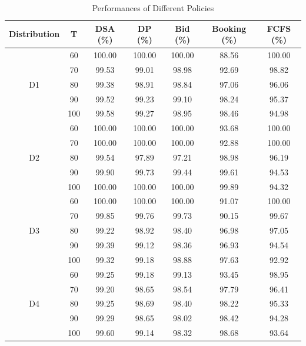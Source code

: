 \begin{table}[h]
  \centering
  \caption{Performances of Different Policies}
  \begin{tabular}{cc|ccccc}
  \hline
  Distribution & T & DSA (\%) & DP (\%) & Bid (\%) & Booking (\%) & FCFS (\%) \\
  \hline
  \multirow{5}{*}{D1} & 60 & 100.00 & 100.00 & 100.00 & 88.56 & 100.00 \\
  & 70    & 99.53 & 99.01 & 98.98 & 92.69 & 98.82 \\
  & 80    & 99.38 & 98.91 & 98.84 & 97.06 & 96.06 \\
  & 90    & 99.52 & 99.23 & 99.10 & 98.24 & 95.37 \\
  & 100   & 99.58 & 99.27 & 98.95 & 98.46 & 94.98 \\
  \hline
  \multirow{5}{*}{D2} & 60  & 100.00 & 100.00 & 100.00 & 93.68 & 100.00 \\
     & 70  & 100.00 & 100.00 & 100.00 & 92.88 & 100.00 \\
     & 80  & 99.54 & 97.89 & 97.21 & 98.98 & 96.19 \\
     & 90  & 99.90 & 99.73 & 99.44 & 99.61 & 94.53 \\
     & 100 & 100.00 & 100.00 & 100.00 & 99.89 & 94.32 \\ 
  \hline
  \multirow{5}{*}{D3} & 60  & 100.00 & 100.00 & 100.00 & 91.07 & 100.00 \\
  & 70  & 99.85 & 99.76 & 99.73 & 90.15 & 99.67 \\
  & 80  & 99.22 & 98.92 & 98.40 & 96.98 & 97.05 \\
  & 90  & 99.39 & 99.12 & 98.36 & 96.93 & 94.54 \\
  & 100  & 99.32 & 99.18 & 98.88 & 97.63 & 92.92 \\
    \hline
    \multirow{5}{*}{D4} & 60  & 99.25 & 99.18 & 99.13 & 93.45 & 98.95 \\
     & 70  & 99.20 & 98.65 & 98.54 & 97.79 & 96.41 \\
     & 80  & 99.25 & 98.69 & 98.40 & 98.22 & 95.33 \\
     & 90  & 99.29 & 98.65 & 98.02 & 98.42 & 94.28 \\
     & 100 & 99.60 & 99.14 & 98.32 & 98.68 & 93.64 \\
  \hline
  \end{tabular}
\end{table}

